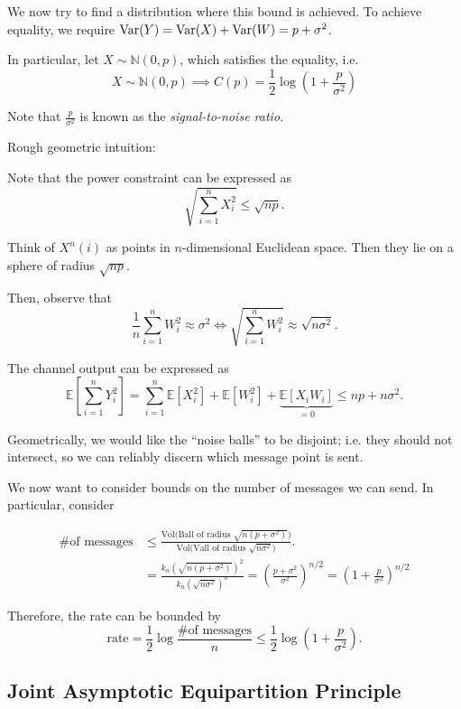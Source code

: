 \documentclass[12pt]{extarticle}
\newcommand{\EE}{\mathbb{E}}
\newcommand{\NN}{\mathbb{N}}
\def\XX{\mathcal{X}}
\begin{document}
We now try to find a distribution where this bound is achieved.  To achieve equality, we require $\text{Var}(Y) = \text{Var}(X) + \text{Var}(W) = p + \sigma^2$.  

In particular, let $X \sim \NN(0, p)$, which satisfies the equality, i.e.
\[
  X \sim \NN(0, p) \implies C(p) = \frac{1}{2} \log \left (1 + \frac{p}{\sigma^2} \right )
\]

Note that $\frac{p}{\sigma^2}$ is known as the {\it signal-to-noise ratio.}

Rough geometric intuition:

Note that the power constraint can be expressed as
\[
  \sqrt{\sum_{i=1}^{n} X_i^2} \leq \sqrt{np}.
\]

Think of $X^n(i)$ as points in $n$-dimensional Euclidean space.  Then they lie on a sphere of radius $\sqrt{np}$.

Then, observe that
\[
  \frac{1}{n} \sum_{i=1}^{n} W_i^2 \approx \sigma^2 \Leftrightarrow \sqrt{\sum_{i=1}^{n} W_i^2} \approx \sqrt{n\sigma^2}.
\]

The channel output can be expressed as
\[
  \EE \left [ \sum_{i=1}^{n} Y_i^2 \right ] = \sum_{i=1}^{n} \EE[X_i^2] + \EE[W_i^2] + \underbrace{\EE[X_i W_i]}_{=0} \leq np + n \sigma^2.
\]

Geometrically, we would like the ``noise balls'' to be disjoint; i.e. they should not intersect, so we can reliably discern which message point is sent.

We now want to consider bounds on the number of messages we can send.  In particular, consider

\begin{align*}
  \text{\# of messages} &\leq \frac{\text{Vol(Ball of radius $\sqrt{n (p + \sigma^2)}$)}}{\text{Vol(Vall of radius $\sqrt{n \sigma^2}$)}}. \\
    &= \frac{k_n (\sqrt{n (p + \sigma^2)})^2}{k_n (\sqrt{n \sigma^2})^n} =\left(  \frac{p + \sigma^2}{\sigma^2} \right)^{n/2} =\left(  1 + \frac{p}{\sigma^2} \right)^{n/2}
\end{align*}

Therefore, the rate can be bounded by
\[
  \text{rate} = \frac{1}{2} \log \frac{\text{\# of messages}}{n} \leq \frac{1}{2} \log\left(  1 + \frac{p}{\sigma^2} \right).
\]

\def\XX{\mathcal{X}}
\def\YY{\mathcal{Y}}
\subsection{Joint Asymptotic Equipartition Principle}
\end{document}
